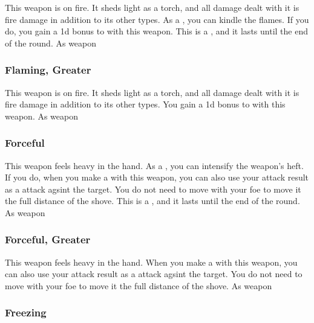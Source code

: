 This weapon is on fire.
It sheds light as a torch, and all damage dealt with it is fire damage in addition to its other types.
As a , you can kindle the flames.
If you do, you gain a \plus1d bonus to  with this weapon.
This is a , and it lasts until the end of the round.
 
 As weapon
\lowercase{\hypertarget{item:Flaming, Greater}{}}\label{item:Flaming, Greater}
\hypertarget{item:Flaming, Greater}{\subsubsection{Flaming, Greater\hfill{}}}
This weapon is on fire.
It sheds light as a torch, and all damage dealt with it is fire damage in addition to its other types.
You gain a \plus1d bonus to  with this weapon.
 
 As weapon
\lowercase{\hypertarget{item:Forceful}{}}\label{item:Forceful}
\hypertarget{item:Forceful}{\subsubsection{Forceful\hfill{}}}
This weapon feels heavy in the hand.
As a , you can intensify the weapon's heft.
If you do, when you make a  with this weapon, you can also use your attack result as a  attack agsint the target.
You do not need to move with your foe to move it the full distance of the shove.
This is a , and it lasts until the end of the round.
 
 As weapon
\lowercase{\hypertarget{item:Forceful, Greater}{}}\label{item:Forceful, Greater}
\hypertarget{item:Forceful, Greater}{\subsubsection{Forceful, Greater\hfill{}}}
This weapon feels heavy in the hand.
When you make a  with this weapon, you can also use your attack result as a  attack agsint the target.
You do not need to move with your foe to move it the full distance of the shove.
 
 As weapon
\lowercase{\hypertarget{item:Freezing}{}}\label{item:Freezing}
\hypertarget{item:Freezing}{\subsubsection{Freezing\hfill{}}}
